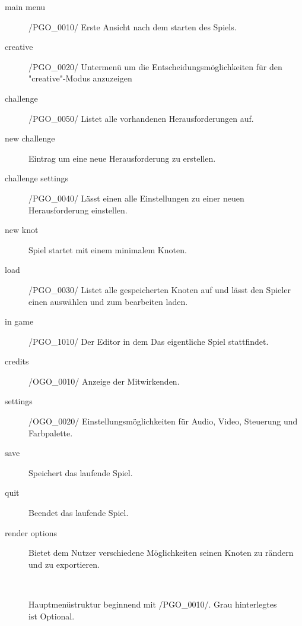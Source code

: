 	\begin{description}
		\item[main menu] /PGO\_0010/ Erste Ansicht nach dem starten des Spiels.
		\item[creative] /PGO\_0020/ Untermenü um die Entscheidungsmöglichkeiten für den "creative"-Modus anzuzeigen
		\item[challenge] /PGO\_0050/ Listet alle vorhandenen Herausforderungen auf.
		\item[new challenge] Eintrag um eine neue Herausforderung zu erstellen.
		\item[challenge settings] /PGO\_0040/ Lässt einen alle Einstellungen zu einer neuen Herausforderung einstellen.
		\item[new knot] Spiel startet mit einem minimalem Knoten.
		\item[load] /PGO\_0030/ Listet alle gespeicherten Knoten auf und lässt den Spieler einen auswählen und zum bearbeiten laden.
		\item[in game] /PGO\_1010/ Der Editor in dem Das eigentliche Spiel stattfindet.
		\item[credits] /OGO\_0010/ Anzeige der Mitwirkenden.
		\item[settings] /OGO\_0020/ Einstellungsmöglichkeiten für Audio, Video, Steuerung und Farbpalette.
		\item[save] Speichert das laufende Spiel.
		\item[quit] Beendet das laufende Spiel.
		\item[render options] Bietet dem Nutzer verschiedene Möglichkeiten seinen Knoten zu rändern und zu exportieren.
	\end{description}
   
   ~\\
    
	\begin{figure}[h]
		\centering
	 	
	 	\caption{Hauptmenüstruktur beginnend mit /PGO\_0010/. Grau hinterlegtes ist Optional.}
	\end{figure}
	
	

